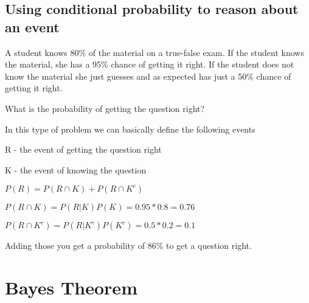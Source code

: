\documentclass[12pt]{article}
\begin{document}
\subsection*{Using conditional probability to reason about an event}

A student knows 80\% of the material on a true-false exam. If the student knows the material, she has a 95\% chance of getting it right. If the student does not know the material she just guesses and as expected has just a 50\% chance of getting it right.

What is the probability of getting the question right?

In this type of problem we can basically define the following events

R - the event of getting the question right

K - the event of knowing the question

$P(R) = P(R \cap K) + P(R \cap K^c)$

$P(R \cap K) = P(R|K)P(K) = 0.95 * 0.8 = 0.76$

$P(R \cap K^c) = P(R|K^c)P(K^c) = 0.5 * 0.2 = 0.1$

Adding those you get a probability of 86\% to get a question right.

\section*{Bayes Theorem}
\end{document}
